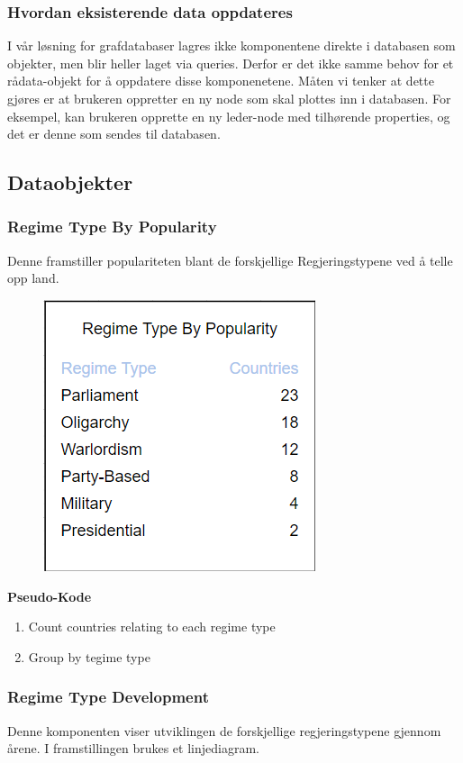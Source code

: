 \subsubsection{Hvordan eksisterende data oppdateres}
I vår løsning for grafdatabaser lagres ikke komponentene direkte i databasen som objekter, men blir 
heller laget via queries. Derfor er det ikke samme behov for et rådata-objekt for å oppdatere disse 
komponenetene. Måten vi tenker at dette gjøres er at brukeren oppretter en ny node som skal 
plottes inn i databasen. For eksempel, kan brukeren opprette en ny leder-node med tilhørende 
properties, og det er denne som sendes til databasen.

\subsection{Dataobjekter}
\subsubsection{Regime Type By Popularity}
Denne framstiller populariteten blant de forskjellige Regjeringstypene ved å telle opp land.

\FigureCounter
\begin{figure}[H]
  \includegraphics[scale=1]{images/milepael4/regimeTypeByPopularity.png}
\end{figure}

\textbf{Pseudo-Kode}
\begin{enumerate}
  \item Count countries relating to each regime type
  \item Group by tegime type
\end{enumerate}

\subsubsection{Regime Type Development}
Denne komponenten viser utviklingen de forskjellige regjeringstypene gjennom årene. I 
framstillingen brukes et linjediagram.

